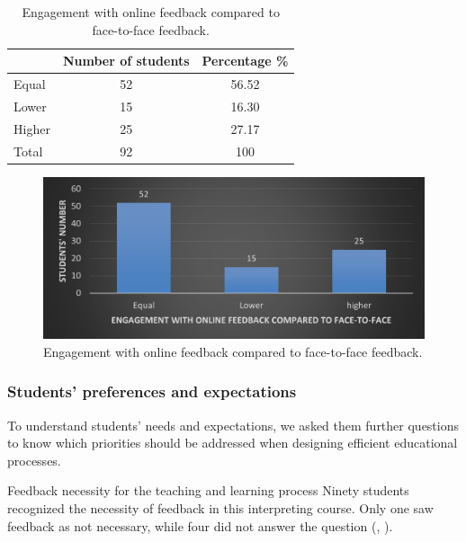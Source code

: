 \documentclass[english]{textolivre}
\begin{document}
\begin{table}[h!]
\centering
\begin{threeparttable}
\caption{Engagement with online feedback compared to face-to-face feedback.}
\label{tbl11}
\begin{tabular}{p{} c c}
\toprule
 & Number of students & Percentage \% \\ \midrule
Equal & 52 & 56.52 \\
Lower & 15 & 16.30 \\
Higher & 25 & 27.17 \\
Total & 92 & 100 \\
\bottomrule
\end{tabular}
\end{threeparttable}
\end{table}

\begin{figure}[h!]
 \centering
 \begin{minipage}{.85\textwidth}
 \includegraphics[width=\textwidth]{11.jpg}
 \caption{Engagement with online feedback compared to face-to-face feedback.}
 \label{fig11}
 \end{minipage}
\end{figure}

\subsubsection{Students’ preferences and expectations}
To understand students’ needs and expectations, we asked them further questions to know which priorities should be addressed when designing efficient educational processes.

Feedback necessity for the teaching and learning process
Ninety students recognized the necessity of feedback in this interpreting course. Only one saw feedback as not necessary, while four did not answer the question (, ).
\end{document}
